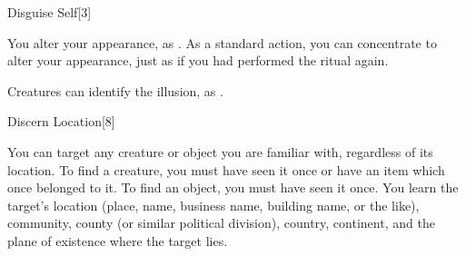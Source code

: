 \begin{spellsection}[Greater]{Disguise Self}[3]
    \begin{spellheader}
    \end{spellheader}
    \begin{spellcontent}
        \begin{spelltargetinginfo}
        \end{spelltargetinginfo}
        \begin{spelleffects}

            \spelleffect You alter your appearance, as . As a standard action, you can concentrate to alter your appearance, just as if you had performed the  ritual again.
            \spelldur \durext \dismissable
        \end{spelleffects}
    \end{spellcontent}
    \begin{spellfooter}
        \spellnotes Creatures can identify the illusion, as .
    \end{spellfooter}
\end{spellsection}

\begin{spellsection}{Discern Location}[8]
    \begin{spellheader}
    \end{spellheader}
    \begin{spellcontent}
        \begin{spelltargetinginfo}
        \end{spelltargetinginfo}
        \begin{spelleffects}

            \spellspecial You can target any creature or object you are familiar with, regardless of its location. To find a creature, you must have seen it once or have an item which once belonged to it. To find an object, you must have seen it once.
            \spelleffect You learn the target's location (place, name, business name, building name, or the like), community, county (or similar political division), country, continent, and the plane of existence where the target lies.
        \end{spelleffects}
    \end{spellcontent}
    \begin{spellfooter}
    \end{spellfooter}
\end{spellsection}

